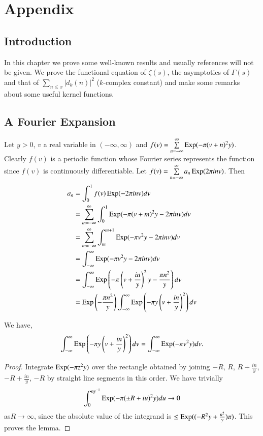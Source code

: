 
\chapter{Appendix}\label{c7}

\section{Introduction}\label{c7:sec7.1}\pageoriginale

In this chapter we prove some well-known results and usually
references will not be given. We prove the functional equation of
$\zeta(s)$, the asymptotics of $\Gamma(s)$ and that of
$\sum\limits_{n\leq x}|d_{k}(n)|^{2}$ ($k$-complex constant) and make
some remarks about some useful kernel functions.

\section{A Fourier Expansion}\label{c7:sec7.2}

Let $y>0$, $v$ a real variable in $(-\infty,\infty)$ and
$f(v)=\sum\limits^{\infty}_{n=-\infty}\operatorname{Exp}(-\pi(v+n)^{2}y)$. Clearly
$f(v)$ is a periodic function whose Fourier series represents the
function since $f(v)$ is continuously differentiable. Let
$f(v)=\sum\limits^{\infty}_{n=-\infty}a_{n}\operatorname{Exp}(2\pi inv)$. Then
\begin{align*}
a_{n} &= \int^{1}_{0}f(v)\operatorname{Exp}(-2\pi inv)dv\\
&=
\sum\limits^{\infty}_{m=-\infty}\int^{1}_{0}\operatorname{Exp}(-\pi(v+m)^{2}y-2\pi
inv)dv\\
&= \sum^{\infty}_{m=-\infty}\int^{m+1}_{m}\operatorname{Exp}(-\pi v^{2}y-2\pi
inv)dv\\
&= \int^{\infty}_{-\infty}\operatorname{Exp}(-\pi v^{2}y-2\pi inv)dv\\
&= \int^{\infty}_{-\infty}\operatorname{Exp}\left(-\pi
\left(v+\frac{in}{y}\right)^{2}y-\frac{\pi n^{2}}{y}\right)dv\\
&= \operatorname{Exp} \left(-\frac{\pi n^{2}}{y}\right)\int^{\infty}_{-\infty}\operatorname{Exp}
\left(-\pi y\left(v+\frac{in}{y}\right)^{2}\right)dv
\end{align*}

\begin{lemma*}
We have,
$$
\int^{\infty}_{-\infty}\operatorname{Exp}\left(-\pi
y\left(v+\frac{in}{y}\right)^{2}\right)dv=\int^{\infty}_{-\infty}\operatorname{Exp}(-\pi
v^{2}y)dv.
$$
\end{lemma*}

\begin{proof}
Integrate $\operatorname{Exp}(-\pi z^{2}y)$ over the rectangle obtained by joining
$-R$, $R$, $R+\frac{in}{y}$, $-R+\frac{in}{y}$, $-R$ by straight line
segments in this order. We have trivially
$$
\int^{ny^{-1}}_{0}\operatorname{Exp}(-\pi(\pm R+iu)^{2}y)du\to 0
$$
as\pageoriginale $R\to \infty$, since the absolute value of the
integrand is $\leq \operatorname{Exp}((-R^{2}y+\frac{n^{2}}{y})\pi)$. This proves
the lemma.
\end{proof}

